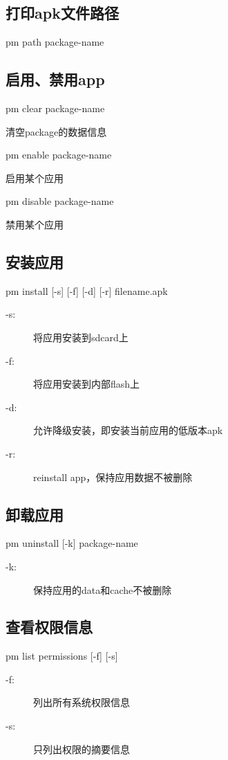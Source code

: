 \subsection[package file path]{打印apk文件路径}
pm path \lt package-name\gt

\subsection[enable or disable packages]{启用、禁用app}
pm clear \lt package-name\gt

清空package的数据信息

pm enable \lt package-name\gt

启用某个应用

pm disable \lt package-name\gt

禁用某个应用

\subsection[安装应用]{安装应用}
pm install [-s] [-f] [-d] [-r] \lt filename.apk\gt
\begin{description}
\item[-s:] 将应用安装到sdcard上
\item[-f:] 将应用安装到内部flash上
\item[-d:] 允许降级安装，即安装当前应用的低版本apk
\item[-r:] reinstall app，保持应用数据不被删除
\end{description}

\subsection[卸载应用]{卸载应用}
pm uninstall [-k] \lt package-name\gt

\begin{description}
\item[-k:] 保持应用的data和cache不被删除
\end{description}

\subsection[查看权限信息]{查看权限信息}
pm list permissions [-f] [-s]

\begin{description}
\item[-f:] 列出所有系统权限信息
\item[-s:] 只列出权限的摘要信息
\end{description}


